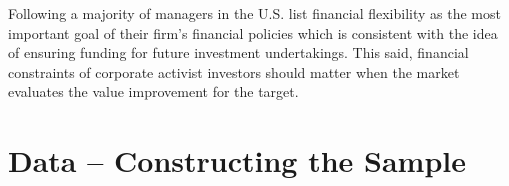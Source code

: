 \documentclass[12pt]{article}
\begin{document}
Following \citet[p.691]{Almeida2011} a majority of managers in the U.S. list financial flexibility as the most important goal of their firm's financial policies which is consistent with the idea of ensuring funding for future investment undertakings. This said, financial constraints of corporate activist investors should matter when the market evaluates the value improvement for the target.

\section{Data -- Constructing the Sample}
\end{document}
